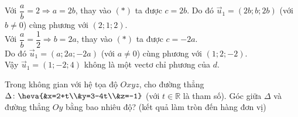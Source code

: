 \begin{ex}
{\begin{itemchoice}
\begin{itemize}
			\end{itemize}
			 Với $\dfrac{a}{b}=2\Rightarrow a=2b$, thay vào $(*)$ ta được $ c=2b$. Do đó $\overrightarrow{u}_1=( 2b;b;2b)$ (với $ b\ne 0$) cùng phương với $(2;1;2)$.\\
			Với $\dfrac{a}{b}=\dfrac{1}{2}\Rightarrow b=2a$,  thay vào $(*)$ ta được $ c=-2a$.\\
			Do đó $\overrightarrow{u}_1=( a;2a;-2a)$ (với $  a\ne 0$) cùng phương với $(1;2;-2)$.\\
			Vậy $\overrightarrow{u}_1=( 1;-2;4)$ không là một vectơ chỉ phương  của $d$.
		\end{itemchoice}
	 }
\end{ex}



\begin{bt}%
	Trong không gian với hệ tọa độ $Oxyz$, cho đường thẳng $\Delta \colon \heva{&x=2+t\\&y=3-4t\\&z=-1}$ (với $t \in \mathbb{R}$  là tham số). Góc giữa $\Delta$ và đường thẳng $Oy$ bằng bao nhiêu độ? (kết quả làm tròn đến hàng đơn vị)
\end{bt}

